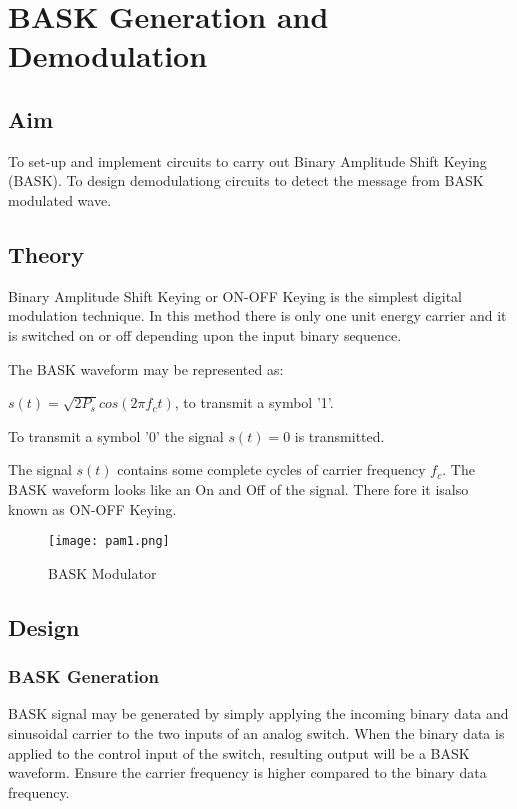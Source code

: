 \chapter[BASK Generation and Demodulation]{BASK Generation and Demodulation}

\section*{Aim}
To set-up and implement circuits to carry out Binary Amplitude Shift Keying (BASK). To design demodulationg circuits to detect the message from BASK modulated wave.
\section*{Theory}

Binary Amplitude Shift Keying or ON-OFF Keying is the simplest digital modulation technique. In this method there is only one unit energy carrier and it is switched on or off depending upon the input binary sequence.

The BASK waveform may be represented as:

$ s(t) = \sqrt{2P_s} cos (2\pi f_ct) $, to transmit a symbol '1'.

To transmit a symbol '0' the signal $ s(t) =0 $ is transmitted. 

The signal $s(t)$ contains some complete cycles of carrier frequency $f_c$. The BASK waveform looks like an On and Off of the signal. There fore it isalso known as ON-OFF Keying.

\begin{figure}[h]
\texttt{[image: pam1.png]}
\caption{BASK Modulator}
\label{baskmod}
\end{figure}


\section*{Design}
\subsection*{BASK Generation}

BASK signal may be generated by simply applying the incoming binary data and sinusoidal carrier to the two inputs of an analog switch. When the binary data is applied to the control input of the switch, resulting output will be a BASK waveform. Ensure the carrier frequency is higher compared to the binary data frequency. 


